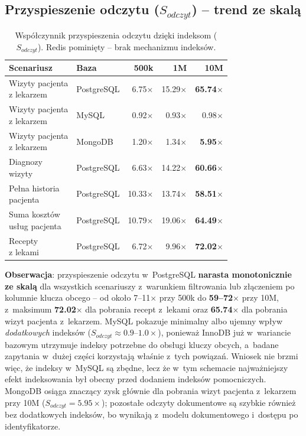 \documentclass[12pt,a4paper]{article}
\begin{document}
\subsection{Przyspieszenie odczytu \texorpdfstring{($S_{odczyt}$)}{(S odczyt)} -- trend ze skalą}

\begin{table}[H]
\centering
\caption{Współczynnik przyspieszenia odczytu dzięki indeksom ($S_{odczyt}$). Redis pominięty -- brak mechanizmu indeksów.}
\label{tab:sread}
\small
\begin{tabular}{@{}llrrr@{}}
\toprule
\textbf{Scenariusz} & \textbf{Baza} & \textbf{500k} & \textbf{1M} & \textbf{10M} \\
\midrule
\shortstack[l]{Wizyty pacjenta\\z lekarzem} & PostgreSQL & 6.75$\times$ & 15.29$\times$ & \textbf{65.74$\times$} \\
\shortstack[l]{Wizyty pacjenta\\z lekarzem} & MySQL & 0.92$\times$ & 0.93$\times$ & 0.98$\times$ \\
\shortstack[l]{Wizyty pacjenta\\z lekarzem} & MongoDB & 1.20$\times$ & 1.34$\times$ & \textbf{5.95$\times$} \\
\midrule
\shortstack[l]{Diagnozy\\wizyty} & PostgreSQL & 6.63$\times$ & 14.22$\times$ & \textbf{60.66$\times$} \\
\shortstack[l]{Pełna historia\\pacjenta} & PostgreSQL & 10.33$\times$ & 13.74$\times$ & \textbf{58.51$\times$} \\
\shortstack[l]{Suma kosztów\\usług pacjenta} & PostgreSQL & 10.79$\times$ & 19.06$\times$ & \textbf{64.49$\times$} \\
\shortstack[l]{Recepty\\z lekami} & PostgreSQL & 6.72$\times$ & 9.96$\times$ & \textbf{72.02$\times$} \\
\bottomrule
\end{tabular}
\end{table}

\textbf{Obserwacja}: przyspieszenie odczytu w~PostgreSQL \textbf{narasta monotonicznie ze skalą} dla wszystkich scenariuszy z~warunkiem filtrowania lub złączeniem po kolumnie klucza obcego -- od około 7--11$\times$ przy 500k do \textbf{59--72$\times$} przy 10M, z~maksimum \textbf{72.02$\times$} dla pobrania recept z~lekami oraz \textbf{65.74$\times$} dla pobrania wizyt pacjenta z~lekarzem. MySQL pokazuje minimalny albo ujemny wpływ \emph{dodatkowych} indeksów ($S_{odczyt} \approx 0.9$--$1.0\times$), ponieważ InnoDB już w~wariancie bazowym utrzymuje indeksy potrzebne do obsługi kluczy obcych, a~badane zapytania w~dużej części korzystają właśnie z~tych powiązań. Wniosek nie brzmi więc, że indeksy w~MySQL są zbędne, lecz że w~tym schemacie najważniejszy efekt indeksowania był obecny przed dodaniem indeksów pomocniczych. MongoDB osiąga znaczący zysk głównie dla pobrania wizyt pacjenta z~lekarzem przy 10M ($S_{odczyt}=5.95\times$); pozostałe odczyty dokumentowe są szybkie również bez dodatkowych indeksów, bo wynikają z~modelu dokumentowego i~dostępu po identyfikatorze.
\end{document}
